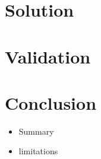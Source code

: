 \documentclass[]{usiinfbachelorproject}
\begin{document}
	
	
	\section{Solution}
	\section{Validation}
	\section{Conclusion}
	\begin{itemize}
		\item Summary
		\item limitations
	\end{itemize}
	
	
	
\end{document}
